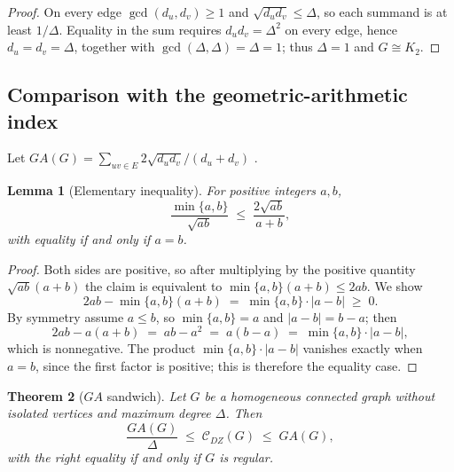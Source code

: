 \documentclass[11pt,a4paper]{article}
\theoremstyle{plain}
\newtheorem{theorem}{Theorem}[section]
\newtheorem{lemma}[theorem]{Lemma}
\theoremstyle{definition}
\theoremstyle{remark}
\newcommand{\CDZ}{\mathcal{C}_{DZ}}
\newcommand{\gcdd}{\operatorname{gcd}}
\begin{document}
\begin{proof}
On every edge $\gcdd(d_u,d_v)\ge1$ and $\sqrt{d_ud_v}\le\Delta$, so each summand
is at least $1/\Delta$. Equality in the sum requires $d_ud_v=\Delta^2$ on every
edge, hence $d_u=d_v=\Delta$, together with $\gcdd(\Delta,\Delta)=\Delta=1$;
thus $\Delta=1$ and $G\cong K_2$.
\end{proof}

\subsection{Comparison with the geometric-arithmetic index}

Let $GA(G)=\sum_{uv\in E}2\sqrt{d_ud_v}/(d_u+d_v)$ \cite{vukicevic2009}.

\begin{lemma}[Elementary inequality]
\label{lem:minmax}
For positive integers $a,b$,
\[
  \frac{\min\{a,b\}}{\sqrt{ab}}\;\le\;\frac{2\sqrt{ab}}{a+b},
\]
with equality if and only if $a=b$.
\end{lemma}

\begin{proof}
Both sides are positive, so after multiplying by the positive quantity
$\sqrt{ab}(a+b)$ the claim is equivalent to $\min\{a,b\}(a+b)\le2ab$. We show
\[
  2ab-\min\{a,b\}(a+b)\;=\;\min\{a,b\}\cdot|a-b|\;\ge\;0 .
\]
By symmetry assume $a\le b$, so $\min\{a,b\}=a$ and $|a-b|=b-a$; then
\[
  2ab-a(a+b) \;=\; ab-a^2 \;=\; a(b-a) \;=\; \min\{a,b\}\cdot|a-b| ,
\]
which is nonnegative. The product $\min\{a,b\}\cdot|a-b|$ vanishes exactly when
$a=b$, since the first factor is positive; this is therefore the equality case.
\end{proof}

\begin{theorem}[$GA$ sandwich]
\label{thm:ga}
Let $G$ be a homogeneous connected graph without isolated vertices and maximum
degree $\Delta$. Then
\[
  \frac{GA(G)}{\Delta}\;\le\;\CDZ(G)\;\le\;GA(G),
\]
with the right equality if and only if $G$ is regular.
\end{theorem}
\end{document}
